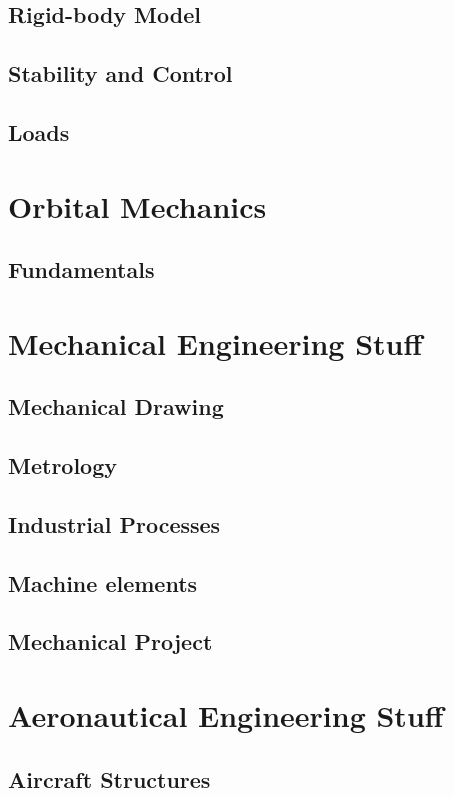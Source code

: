\section{Rigid-body Model}
\section{Stability and Control}
\section{Loads}

\chapter{Orbital Mechanics}

\section{Fundamentals}

\chapter{Mechanical Engineering Stuff}

\section{Mechanical Drawing}
\section{Metrology}
\section{Industrial Processes}
\section{Machine elements}
\section{Mechanical Project}

\chapter{Aeronautical Engineering Stuff}

\section{Aircraft Structures}
